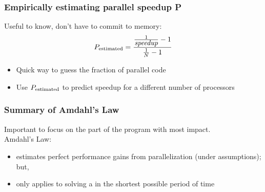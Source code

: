 \documentclass[aspectratio=43]{beamer}
\begin{document}
\begin{frame}
  \frametitle{Empirically estimating parallel speedup P}

  \hspace*{2em} Useful to know, don't have to commit to memory:
  \vfill
  \[P_{\mbox{\scriptsize estimated}} = \frac{\frac{1}{\mbox{\em speedup}}-1}{\frac{1}{N}-1}\]
  \vfill
  \hspace*{2em} \begin{minipage}{.8\textwidth} \begin{itemize}
    \item Quick way to guess the fraction of parallel code
    \item Use $P_{\mbox{\scriptsize estimated}}$ to predict speedup for a different number of processors
  \end{itemize} \end{minipage}
\end{frame}

\begin{frame}
  \frametitle{Summary of Amdahl's Law}

\hspace*{2em} Important to focus on the part of the program with most impact.\\[1em]

\hspace*{2em} Amdahl's Law:\\[1em]
\hspace*{2em} \begin{minipage}{.8\textwidth}
  \begin{itemize}
    \item estimates perfect performance gains from
          parallelization (under assumptions); but,
    \vfill
    \item only applies to solving a  in the
          shortest possible period of time
  \end{itemize} \end{minipage}
\end{frame}
\end{document}
